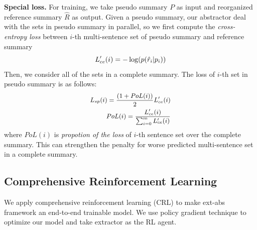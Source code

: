 \textbf{Special loss.} For training, 
we take pseudo summary $P$ as input
and reorganized reference summary $\hat{R}$ as output.
Given a pseudo summary, our abstractor deal with the sets in pseudo summary in parallel,
so we first compute the \textit{cross-entropy loss} between $i$-th multi-sentence set of 
pseudo summary and reference summary 
\begin{equation}
\small
L'_{ce}(i) = - \log(p(\hat{r}_i|p_i))
\end{equation}
Then, we consider all of the sets in a complete summary.
The loss of $i$-th set in pseudo summary is as follows:
\begin{equation}
\small
\begin{aligned}
\small
L_{sp}(i) = \frac{(1+PoL(i))}{2} L'_{ce}(i) \\
PoL(i) = \frac{L'_{ce}(i)}{\sum_{i=0}^{m}{L'_{ce}(i)}}
\end{aligned}
\end{equation}
where $PoL(i)$ is
\textit{propotion of the loss} of $i$-th sentence set over the complete summary.
This can strengthen the penalty for worse predicted multi-sentence set in a complete summary.

\subsection{Comprehensive Reinforcement Learning}
\label{sec:rl}
We apply comprehensive reinforcement learning (CRL) to make ext-abs framework an end-to-end trainable model.
We use policy gradient technique to optimize our model and take 
extractor as the RL agent.

